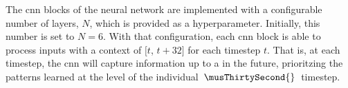 
The \gls{cnn} blocks of the neural network are implemented
with a configurable number of layers, $N$, which is provided
as a hyperparameter. Initially, this number is set to $N=6$.
With that configuration, each \gls{cnn} block is able to
process inputs with a context of $[t$, $t + 32]$ for each
timestep $t$. That is, at each \musThirtySecond{} timestep,
the \gls{cnn} will capture information up to a \musWhole{}
in the future, prioritzing the patterns learned at the level
of the individual $\: \musThirtySecond{} \:$ timestep.
